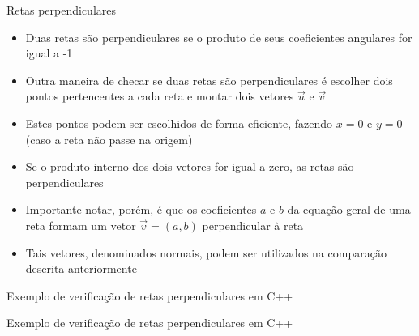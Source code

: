 \begin{frame}[fragile]{Retas perpendiculares}

    \begin{itemize}
        \item Duas retas são perpendiculares se o produto de seus coeficientes angulares for igual a -1
        \pause

        \item Outra maneira de checar se duas retas são perpendiculares é escolher dois pontos
        pertencentes a cada reta e montar dois vetores $\vec{u}$ e $\vec{v}$
        \pause

        \item Estes pontos podem ser escolhidos de forma eficiente, fazendo $x = 0$ e $y = 0$
        (caso a reta não passe na origem)
        \pause

        \item Se o produto interno dos dois vetores for igual a zero, as retas são perpendiculares
        \pause

        \item Importante notar, porém, é que os coeficientes $a$ e $b$ da equação geral de uma
            reta formam um vetor $\vec{v} = (a, b)$ perpendicular à reta
        \pause

        \item Tais vetores, denominados normais, podem ser utilizados na comparação descrita anteriormente
    \end{itemize}

\end{frame}

\begin{frame}[fragile]{Exemplo de verificação de retas perpendiculares em C++}
\end{frame}

\begin{frame}[fragile]{Exemplo de verificação de retas perpendiculares em C++}
\end{frame}
